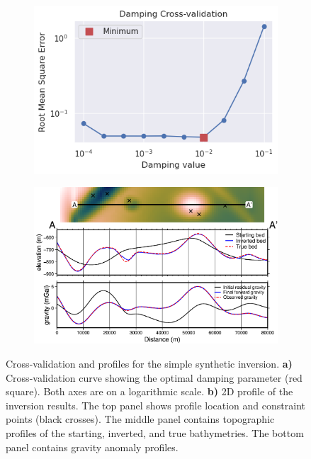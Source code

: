 \begin{figure}[!ht]
  \centering
    \begin{subfigure}[t]{.40\textwidth}
        \centering
        \includegraphics[width=\textwidth]{figures/chp3/chp3_simple_CV.png}
        \caption{}
    \end{subfigure}
    \begin{subfigure}[t]{.58\textwidth}
        \centering
        \includegraphics[width=\textwidth]{figures/chp3/chp3_simple_profile.png}
        \caption{}
    \end{subfigure}
  \caption[Annulus approximation inversion cross-validation and profile]{Cross-validation and profiles for the simple synthetic inversion. \textbf{a)} Cross-validation curve showing the optimal damping parameter (red square). Both axes are on a logarithmic scale. \textbf{b)} 2D profile of the inversion results. The top panel shows profile location and constraint points (black crosses). The middle panel contains topographic profiles of the starting, inverted, and true bathymetries. The bottom panel contains gravity anomaly profiles.}
    \label{fig:chp3_simple_CV_and_profile}
\end{figure}

